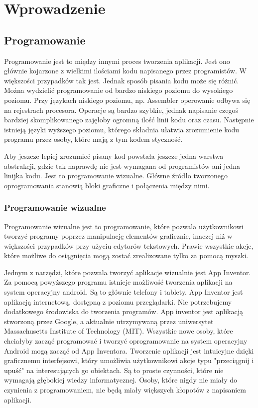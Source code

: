\chapter{Wprowadzenie}
\label{c1}

\section{Programowanie}
\label{c11}

Programowanie jest to między innymi proces tworzenia aplikacji. Jest ono głównie kojarzone z wielkimi ilościami kodu napisanego przez programistów. W większości przypadków tak jest. Jednak sposób pisania kodu może się różnić. Można wydzielić programowanie od bardzo niskiego poziomu do wysokiego poziomu. Przy językach niskiego poziomu, np. Assembler operowanie odbywa się na rejestrach procesora. Operacje są bardzo szybkie, jednak napisanie czegoś bardziej skomplikowanego zajęłoby ogromną ilość linii kodu oraz czasu. Następnie istnieją języki wyższego poziomu, którego składnia ułatwia zrozumienie kodu programu przez osoby, które mają z tym kodem styczność.

Aby jeszcze lepiej zrozumieć pisany kod powstała jeszcze jedna warstwa abstrakcji, gdzie tak naprawdę nie jest wymagana od programistów ani jedna linijka kodu. Jest to programowanie wizualne. Główne źródło tworzonego oprogramowania stanowią bloki graficzne i połączenia między nimi.


\subsection{Programowanie wizualne}
\label{c111}
Programowanie wizualne jest to programowanie, które pozwala użytkownikowi tworzyć programy poprzez manipulację elementów graficznie, inaczej niż w większości przypadków przy użyciu edytorów tekstowych. Prawie wszystkie akcje, które możliwe do osiągnięcia mogą zostać zrealizowane tylko za pomocą myszki.

Jednym z narzędzi, które pozwala tworzyć aplikacje wizualnie jest App Inventor. Za pomocą powyższego programu istnieje możliwość tworzenia aplikacji na system operacyjny android. Są to głównie telefony i tablety. App Inventor jest aplikacją internetową, dostępną z poziomu przeglądarki. Nie potrzebujemy dodatkowego środowiska do tworzenia programów. App inventor jest aplikacją stworzoną przez Google, a aktualnie utrzymywaną przez uniwersytet Massachusetts Institute of Technology (MIT). Wszystkie nowe osoby, które chciałyby zacząć programować i tworzyć oprogramowanie na system operacyjny Android mogą zacząć od App Inventora. Tworzenie aplikacji jest intuicyjne dzięki graficznemu interfejsowi, który umożliwia użytkownikowi akcje typu "przeciągnij i upuść" na interesujących go obiektach.\cite{wiki:appinventor} Są to proste czynności, które nie wymagają głębokiej wiedzy informatycznej. Osoby, które nigdy nie miały do czynienia z programowaniem, nie będą miały większych kłopotów z napisaniem aplikacji.

